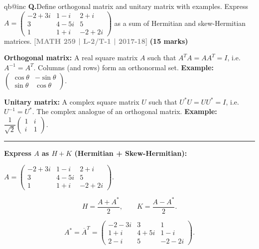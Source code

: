 \documentclass[12pt,a3paper]{article}
\makeatletter
\newcommand{\yr}[1]{\hfill\textcolor{gray}{\small\textbf{[#1]}}}
\newcommand{\mk}[1]{\textcolor{orange!70!black}{\small\textbf{(#1 marks)}}}
\newcounter{qnum}
\newcommand{\Q}[1]{%
  \csname qb@inc\endcsname
  \needspace{4\baselineskip}
  \refstepcounter{qnum}
  \vspace{6pt}
  \noindent\textbf{Q\theqnum.}\enspace #1\par
}
\makeatother
\begin{document}
\Q{Define orthogonal matrix and unitary matrix with examples. Express \\$A = \begin{pmatrix} -2+3i & 1-i & 2+i \\ 3 & 4-5i & 5 \\ 1 & 1+i & -2+2i \end{pmatrix}$ as a sum of Hermitian and skew-Hermitian matrices.
\yr{MATH 259 | L-2/T-1 | 2017-18} \mk{15}}

\begin{tcolorbox}[enhanced,breakable,
  colback=cG!4,colframe=cG,boxrule=0.8pt,arc=5pt,
  title={\textbf{Answer --- Orthogonal/Unitary Matrices; Hermitian + Skew-Hermitian Decomposition}},
  fonttitle=\bfseries\color{white},colbacktitle=cG]
 
\textbf{Orthogonal matrix:} A real square matrix $A$ such that $A^TA = AA^T = I$,
i.e.\ $A^{-1}=A^T$. Columns (and rows) form an orthonormal set.
\textbf{Example:} $\begin{pmatrix}\cos\theta&-\sin\theta\\\sin\theta&\cos\theta\end{pmatrix}$.
 
\medskip
\textbf{Unitary matrix:} A complex square matrix $U$ such that $U^*U = UU^* = I$,
i.e.\ $U^{-1}=U^*$. The complex analogue of an orthogonal matrix.
\textbf{Example:} $\dfrac{1}{\sqrt{2}}\begin{pmatrix}1&i\\i&1\end{pmatrix}$.
 
\medskip
\textcolor{cG}{\rule{\textwidth}{0.4pt}}
 
\textbf{Express $A$ as $H + K$ (Hermitian + Skew-Hermitian):}
 
$A = \begin{pmatrix}-2+3i&1-i&2+i\\3&4-5i&5\\1&1+i&-2+2i\end{pmatrix}$.
 
\[
H = \frac{A+A^*}{2}, \qquad K = \frac{A-A^*}{2}.
\]
 
\[
A^* = \overline{A}^T = \begin{pmatrix}-2-3i&3&1\\1+i&4+5i&1-i\\2-i&5&-2-2i\end{pmatrix}.
\]
 

\end{tcolorbox}
\end{document}
